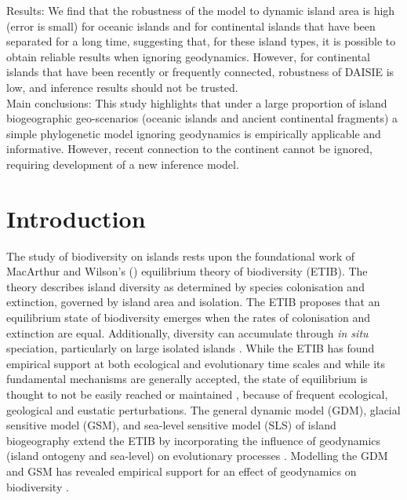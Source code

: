\documentclass{article}
\begin{document}
\noindent Results: We find that the robustness of the model to dynamic island area is high (error is small) for oceanic islands and for continental islands that have been separated for a long time, suggesting that, for these island types, it is possible to obtain reliable results when ignoring geodynamics. However, for continental islands that have been recently or frequently connected, robustness of DAISIE is low, and inference results should not be trusted. \\

\noindent Main conclusions: This study highlights that under a large proportion of island biogeographic geo-scenarios (oceanic islands and ancient continental fragments) a simple phylogenetic model ignoring geodynamics is empirically applicable and informative. However, recent connection to the continent cannot be ignored, requiring development of a new inference model.

\clearpage

\section*{Introduction}

The study of biodiversity on islands rests upon the foundational work of MacArthur and Wilson’s (\citeyear{macarthur_equilibrium_1963, macarthur_theory_1967}) equilibrium theory of biodiversity (ETIB). The theory describes island diversity as determined by species colonisation and extinction, governed by island area and isolation. The ETIB proposes that an equilibrium state of biodiversity emerges when the rates of colonisation and extinction are equal. Additionally, diversity can accumulate through \textit{in situ} speciation, particularly on large isolated islands \citep{macarthur_theory_1967, losos_analysis_2000, rosindell_unified_2011, valente_simple_2020}. While the ETIB has found empirical support at both ecological \citep{simberloff_experimental_1970} and evolutionary \citep{valente_equilibrium_2017, valente_simple_2020} time scales and while its fundamental mechanisms are generally accepted, the state of equilibrium is thought to not be easily reached or maintained \citep{heaney_dynamic_2000, whittaker_general_2008, valente_effects_2014, warren_islands_2015, fernandezpalacios_towards_2016, marshall_uncertain_2016}, because of frequent ecological, geological and eustatic perturbations. The general dynamic model (GDM), glacial sensitive model (GSM), and sea-level sensitive model (SLS) of island biogeography extend the ETIB by incorporating the influence of geodynamics (island ontogeny and sea-level) on evolutionary processes \citep{whittaker_general_2008, fernandezpalacios_towards_2016, avila_towards_2019}. Modelling the GDM and GSM has revealed empirical support for an effect of geodynamics on biodiversity \citep{whittaker_general_2008, bunnefeld_island_2012, steinbauer_re-evaluating_2013, rijsdijk_quantifying_2014, lim_true_2017}. \\
\end{document}
